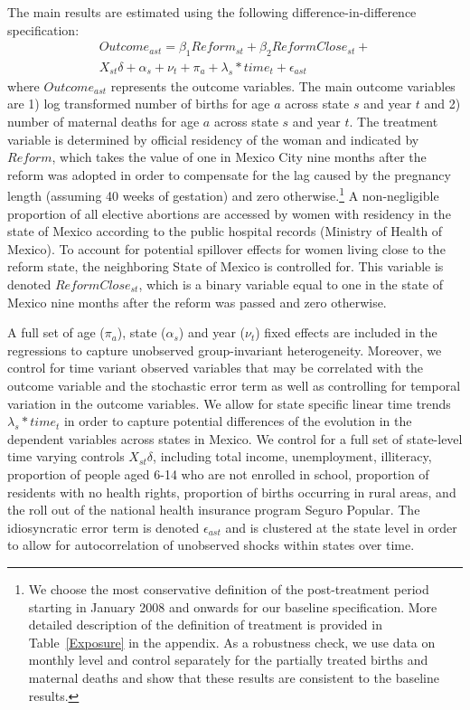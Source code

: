 \documentclass[a4paper, 11pt]{article}
\begin{document}
\begin{spacing}{2}
The main results are estimated using the following difference-in-difference specification:
\begin{eqnarray}\label{eq1}
	Outcome_{ast}= \beta_{1} Reform_{st} +\beta_{2} ReformClose_{st}+ \nonumber\\
	X_{st}\delta +\alpha_{s} + \nu_{t} +\pi_{a}+ \lambda_{s}*time_{t} +\epsilon_{ast}   
\end{eqnarray}
where $Outcome_{ast}$ represents the outcome variables. The main outcome variables are 1) log transformed number of births for age $a$ across state $s$ and year $t$ and 2) number of maternal deaths for age $a$ across state $s$ and year $t$. The treatment variable is determined by official residency of the woman and indicated by $Reform$, which takes the value of one in Mexico City nine months after the reform was adopted in order to compensate for the lag caused by the pregnancy length (assuming 40 weeks of gestation) and zero otherwise.\footnote{We choose the most conservative definition of the post-treatment period starting in January 2008 and onwards for our baseline specification. More detailed description of the definition of treatment is provided in Table~\ref*{Exposure} in the appendix. As a robustness check, we use data on monthly level and control separately for the partially treated births and maternal deaths and show that these results are consistent to the baseline results.} A non-negligible proportion of all elective abortions are accessed by women with residency in the state of Mexico according to the public hospital records (Ministry of Health of Mexico). To account for potential spillover effects for women living close to the reform state, the neighboring State of Mexico is controlled for. This variable is denoted $ReformClose_{st}$, which is a binary variable equal to one in the state of Mexico nine months after the reform was passed and zero otherwise. 

A full set of age ($\pi_{a}$), state ($\alpha_{s}$) and year ($\nu_{t}$) fixed effects are included in the regressions to capture unobserved group-invariant heterogeneity. Moreover, we control for time variant observed variables that may be correlated with the outcome variable and the stochastic error term as well as controlling for temporal variation in the outcome variables. We allow for state specific linear time trends $\lambda_{s}*time_{t}$ in order to capture potential differences of the evolution in the dependent variables across states in Mexico. We control for a full set of state-level time varying controls $X_{st}\delta$, including total income, unemployment, illiteracy, proportion of people aged 6-14 who are not enrolled in school, proportion of residents with no health rights, proportion of births occurring in rural areas, and the roll out of the national health insurance program Seguro Popular. The idiosyncratic error term is denoted $\epsilon_{ast}$ and is clustered at the state level in order to allow for autocorrelation of unobserved shocks within states over time.


\end{spacing}
\end{document}

